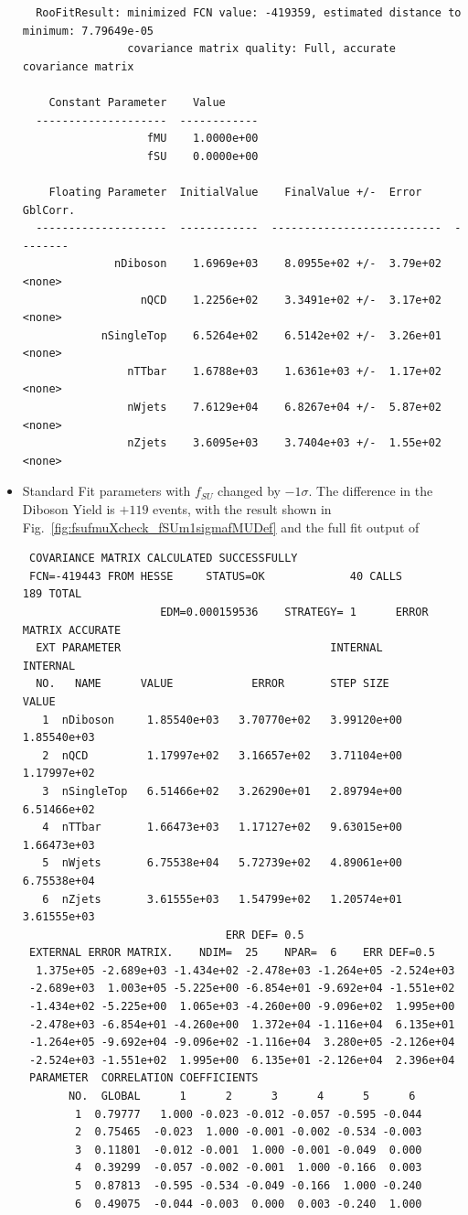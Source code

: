 \begin{itemize}
{\begin{verbatim}
  RooFitResult: minimized FCN value: -419359, estimated distance to minimum: 7.79649e-05
                covariance matrix quality: Full, accurate covariance matrix

    Constant Parameter    Value     
  --------------------  ------------
                   fMU    1.0000e+00
                   fSU    0.0000e+00

    Floating Parameter  InitialValue    FinalValue +/-  Error     GblCorr.
  --------------------  ------------  --------------------------  --------
              nDiboson    1.6969e+03    8.0955e+02 +/-  3.79e+02  <none>
                  nQCD    1.2256e+02    3.3491e+02 +/-  3.17e+02  <none>
            nSingleTop    6.5264e+02    6.5142e+02 +/-  3.26e+01  <none>
                nTTbar    1.6788e+03    1.6361e+03 +/-  1.17e+02  <none>
                nWjets    7.6129e+04    6.8267e+04 +/-  5.87e+02  <none>
                nZjets    3.6095e+03    3.7404e+03 +/-  1.55e+02  <none>

\end{verbatim}
}


\item Standard Fit parameters with $f_{SU}$ changed by $-1\sigma$. The difference in the Diboson Yield is $+119$ events, with the result shown in Fig.~\ref{fig:fsufmuXcheck_fSUm1sigmafMUDef} and the full fit output of
{\tiny
\begin{verbatim}
 COVARIANCE MATRIX CALCULATED SUCCESSFULLY
 FCN=-419443 FROM HESSE     STATUS=OK             40 CALLS         189 TOTAL
                     EDM=0.000159536    STRATEGY= 1      ERROR MATRIX ACCURATE 
  EXT PARAMETER                                INTERNAL      INTERNAL  
  NO.   NAME      VALUE            ERROR       STEP SIZE       VALUE   
   1  nDiboson     1.85540e+03   3.70770e+02   3.99120e+00   1.85540e+03
   2  nQCD         1.17997e+02   3.16657e+02   3.71104e+00   1.17997e+02
   3  nSingleTop   6.51466e+02   3.26290e+01   2.89794e+00   6.51466e+02
   4  nTTbar       1.66473e+03   1.17127e+02   9.63015e+00   1.66473e+03
   5  nWjets       6.75538e+04   5.72739e+02   4.89061e+00   6.75538e+04
   6  nZjets       3.61555e+03   1.54799e+02   1.20574e+01   3.61555e+03
                               ERR DEF= 0.5
 EXTERNAL ERROR MATRIX.    NDIM=  25    NPAR=  6    ERR DEF=0.5
  1.375e+05 -2.689e+03 -1.434e+02 -2.478e+03 -1.264e+05 -2.524e+03 
 -2.689e+03  1.003e+05 -5.225e+00 -6.854e+01 -9.692e+04 -1.551e+02 
 -1.434e+02 -5.225e+00  1.065e+03 -4.260e+00 -9.096e+02  1.995e+00 
 -2.478e+03 -6.854e+01 -4.260e+00  1.372e+04 -1.116e+04  6.135e+01 
 -1.264e+05 -9.692e+04 -9.096e+02 -1.116e+04  3.280e+05 -2.126e+04 
 -2.524e+03 -1.551e+02  1.995e+00  6.135e+01 -2.126e+04  2.396e+04 
 PARAMETER  CORRELATION COEFFICIENTS  
       NO.  GLOBAL      1      2      3      4      5      6
        1  0.79777   1.000 -0.023 -0.012 -0.057 -0.595 -0.044
        2  0.75465  -0.023  1.000 -0.001 -0.002 -0.534 -0.003
        3  0.11801  -0.012 -0.001  1.000 -0.001 -0.049  0.000
        4  0.39299  -0.057 -0.002 -0.001  1.000 -0.166  0.003
        5  0.87813  -0.595 -0.534 -0.049 -0.166  1.000 -0.240
        6  0.49075  -0.044 -0.003  0.000  0.003 -0.240  1.000


\end{verbatim}}
\end{itemize}
